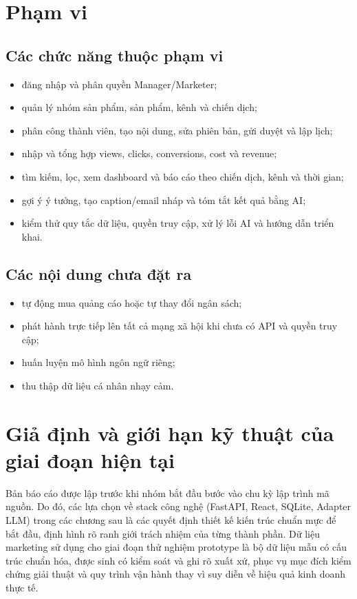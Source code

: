\section{Phạm vi}

\subsection{Các chức năng thuộc phạm vi}

\begin{itemize}
\item đăng nhập và phân quyền Manager/Marketer;
\item quản lý nhóm sản phẩm, sản phẩm, kênh và chiến dịch;
\item phân công thành viên, tạo nội dung, sửa phiên bản, gửi duyệt và lập lịch;
\item nhập và tổng hợp views, clicks, conversions, cost và revenue;
\item tìm kiếm, lọc, xem dashboard và báo cáo theo chiến dịch, kênh và thời gian;
\item gợi ý ý tưởng, tạo caption/email nháp và tóm tắt kết quả bằng AI;
\item kiểm thử quy tắc dữ liệu, quyền truy cập, xử lý lỗi AI và hướng dẫn triển khai.
\end{itemize}

\subsection{Các nội dung chưa đặt ra}

\begin{itemize}
\item tự động mua quảng cáo hoặc tự thay đổi ngân sách;
\item phát hành trực tiếp lên tất cả mạng xã hội khi chưa có API và quyền truy cập;
\item huấn luyện mô hình ngôn ngữ riêng;
\item thu thập dữ liệu cá nhân nhạy cảm.
\end{itemize}

\section{Giả định và giới hạn kỹ thuật của giai đoạn hiện tại}

Bản báo cáo được lập trước khi nhóm bắt đầu bước vào chu kỳ lập trình mã nguồn. Do đó, các lựa chọn về stack công nghệ (FastAPI, React, SQLite, Adapter LLM) trong các chương sau là các quyết định thiết kế kiến trúc chuẩn mực để bắt đầu, định hình rõ ranh giới trách nhiệm của từng thành phần. Dữ liệu marketing sử dụng cho giai đoạn thử nghiệm prototype là bộ dữ liệu mẫu có cấu trúc chuẩn hóa, được sinh có kiểm soát và ghi rõ xuất xứ, phục vụ mục đích kiểm chứng giải thuật và quy trình vận hành thay vì suy diễn về hiệu quả kinh doanh thực tế.


